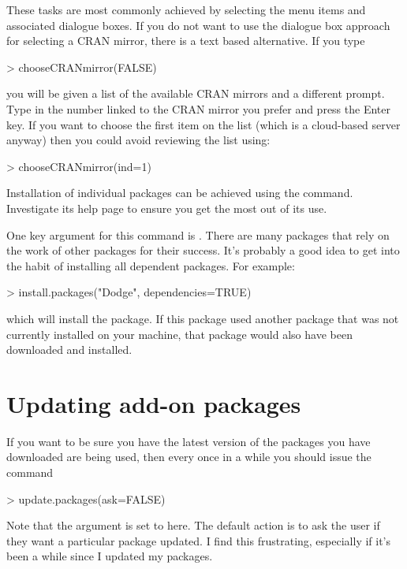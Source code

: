 These tasks are most commonly achieved by selecting the menu items and associated dialogue boxes. If you do not want to use the dialogue box approach for selecting a CRAN mirror, there is a text based alternative. If you type
\begin{Schunk}
\begin{Sinput}
> chooseCRANmirror(FALSE)
\end{Sinput}
\end{Schunk}
you will be given a list of the available CRAN mirrors and a different prompt. Type in the number linked to the CRAN mirror you prefer and press the Enter key. If you want to choose the first item on the list (which is a cloud-based server anyway) then you could avoid reviewing the list using:
\begin{Schunk}
\begin{Sinput}
> chooseCRANmirror(ind=1)
\end{Sinput}
\end{Schunk}

Installation of individual packages can be achieved using the  command. Investigate its help page to ensure you get the most out of its use. 

One key argument for this command is . There are many packages that rely on the work of other packages for their success. It's probably a good idea to get into the habit of installing all dependent packages. For example:
\begin{Schunk}
\begin{Sinput}
> install.packages("Dodge", dependencies=TRUE)
\end{Sinput}
\end{Schunk}
which will install the  package. If this package used another package that was not currently installed on your machine, that package would also have been downloaded and installed.

\section{Updating add-on packages}

If you want to be sure you have the latest version of the packages you have downloaded are being used, then every once in a while you should issue the command
\begin{Schunk}
\begin{Sinput}
> update.packages(ask=FALSE)
\end{Sinput}
\end{Schunk}
Note that the  argument is set to  here. The default action is to ask the user if they want a particular package updated. I find this frustrating, especially if it's been a while since I updated my packages.

